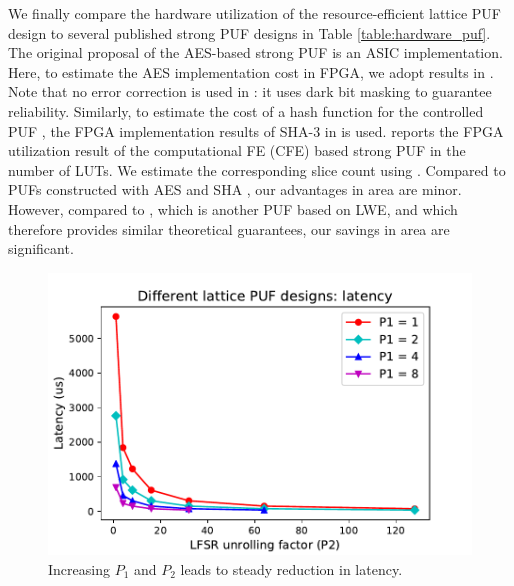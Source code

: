 

We finally compare the hardware utilization of the resource-efficient lattice PUF design to several published strong PUF designs \cite{bhargava2014efficient, gassend2008controlled, jin2017fpga} in Table \ref{table:hardware_puf}. 
The original proposal of the AES-based strong PUF \cite{bhargava2014efficient} is an ASIC implementation. 
Here, to estimate the AES implementation cost in FPGA, we adopt results in \cite{chu2012low}.
Note that no error correction is used in \cite{bhargava2014efficient}: it uses dark bit masking to guarantee reliability. 
Similarly, to estimate the cost of a hash function for the controlled PUF \cite{gassend2008controlled}, the FPGA implementation results of SHA-3 in \cite{kaps2011lightweight} is used.
\cite{jin2017fpga} reports the FPGA utilization result of the computational FE (CFE) based strong PUF in the number of LUTs.
We estimate the corresponding slice count using \cite{xilinx:ds190}. 
Compared to PUFs constructed with AES \cite{chu2012low} and SHA \cite{kaps2011lightweight}, our advantages in area are minor. 
However, compared to \cite{herder2017trapdoor, jin2017fpga}, which is another PUF based on LWE, and which therefore provides similar theoretical guarantees, our savings in area are significant.

\begin{figure}[t!]
\centering
\includegraphics[width = 0.8\linewidth]{./figs/design_space_latency.pdf}
\caption{Increasing $P_1$ and $P_2$ leads to steady reduction in latency.}
\label{fig:design_space_latency}
\end{figure}

